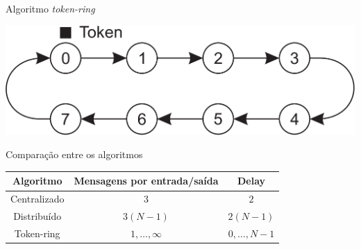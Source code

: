 \documentclass[compress]{beamer}
\begin{document}

\begin{frame}{Algoritmo \textit{token-ring}}

 \vspace{1cm}

\centering \includegraphics[width=\textwidth]{images/token-ring.png} 
\end{frame}


\begin{frame}{Comparação entre os algoritmos}

\begin{table}[]
\centering
\begin{tabular}{@{}ccc@{}}
\toprule
Algoritmo    & Mensagens por entrada/saída & Delay      \\ \midrule
Centralizado & $3$                         & $2$          \\
Distribuído  & $3(N - 1)$                  & $2 (N-1)$    \\
Token-ring   & $1, \ldots, \infty$         & $0, \ldots, N-1$ \\ \bottomrule
\end{tabular}%
\end{table}

\end{frame}
\end{document}
